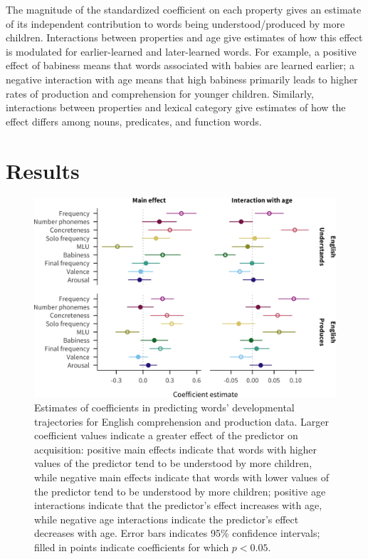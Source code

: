 \documentclass[manuscript]{stjour}
\begin{document}
The magnitude of the standardized coefficient on each property gives an
estimate of its independent contribution to words being
understood/produced by more children. Interactions between properties
and age give estimates of how this effect is modulated for
earlier-learned and later-learned words. For example, a positive effect
of babiness means that words associated with babies are learned earlier;
a negative interaction with age means that high babiness primarily leads
to higher rates of production and comprehension for younger children.
Similarly, interactions between properties and lexical category give
estimates of how the effect differs among nouns, predicates, and
function words.

\section{Results}

\begin{figure}

{\centering \includegraphics[width=\textwidth]{refcoefs-1}

}

\caption{Estimates of coefficients in predicting words' developmental trajectories for English comprehension and production data. Larger coefficient values indicate a greater effect of the predictor on acquisition: positive main effects indicate that words with higher values of the predictor tend to be understood by more children, while negative main effects indicate that words with lower values of the predictor tend to be understood by more children; positive age interactions indicate that the predictor's effect increases with age, while negative age interactions indicate the predictor's effect decreases with age. Error bars indicates 95\% confidence intervals; filled in points indicate coefficients for which $p < 0.05$.}\label{fig:refcoefs}
\end{figure}
\end{document}
